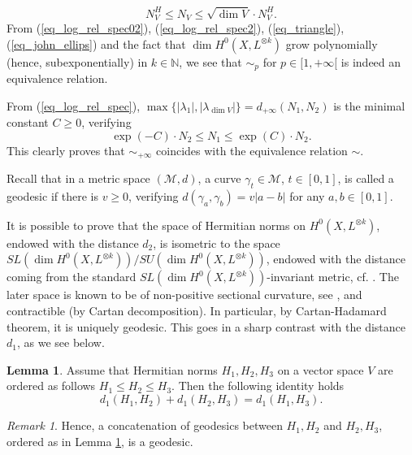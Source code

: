\documentclass[12pt]{article}
\numberwithin{equation}{section}
\theoremstyle{theorem}
\theoremstyle{definition}
\newtheorem{lem}[thm]{Lemma}
\theoremstyle{remark}
\newtheorem{rem}[thm]{Remark}
\newcommand{\nat}{\mathbb{N}}
\begin{document}
	\begin{equation}\label{eq_john_ellips}
		N_V^H \leq N_V \leq \sqrt{\dim V} \cdot N_V^H.
	\end{equation}
	From (\ref{eq_log_rel_spec02}), (\ref{eq_log_rel_spec2}), (\ref{eq_triangle}), (\ref{eq_john_ellips}) and the fact that $\dim H^0(X, L^{\otimes k})$ grow polynomially (hence, subexponentially) in $k \in \nat$, we see that $\sim_p$ for $p \in [1, +\infty[$ is indeed an equivalence relation.
	\par 
	From (\ref{eq_log_rel_spec}), $\max \{ |\lambda_1|, |\lambda_{\dim V}| \} = d_{+ \infty}(N_1, N_2)$ is the minimal constant $C \geq 0$, verifying
	\begin{equation}
		\exp(- C) \cdot N_2 \leq N_1 \leq \exp(C) \cdot N_2.
	\end{equation}
	This clearly proves that $\sim_{+ \infty}$ coincides with the equivalence relation $\sim$.
	\par 
	Recall that in a metric space $(\mathcal{M}, d)$, a curve $\gamma_t \in \mathcal{M}$, $t \in [0, 1]$, is called a geodesic if there is $v \geq 0$, verifying $d(\gamma_a, \gamma_b) = v |a - b|$ for any $a, b \in [0, 1]$.
	\par 
	It is possible to prove that the space of Hermitian norms on $H^0(X, L^{\otimes k})$, endowed with the distance $d_2$, is isometric to the space $SL(\dim H^0(X, L^{\otimes k})) / SU(\dim H^0(X, L^{\otimes k}))$, endowed with the distance coming from the standard $SL(\dim H^0(X, L^{\otimes k}))$-invariant metric, cf. \cite[Theorem 1.1]{DarvLuRub}.
	The later space is known to be of non-positive sectional curvature, see \cite[Theorem XI.8.6]{KobNom2}, and contractible (by Cartan decomposition).
	In particular, by Cartan-Hadamard theorem, it is uniquely geodesic.
	This goes in a sharp contrast with the distance $d_1$, as we see below.
	\par 
	\begin{lem}\label{lem_d_1_ident_metr}
		Assume that Hermitian norms $H_1, H_2, H_3$ on a vector space $V$ are ordered as follows $H_1 \leq H_2 \leq H_3$.
		Then the following identity holds
		\begin{equation}\label{eq_d_1_ident_metr}
			d_1(H_1, H_2) + d_1(H_2, H_3) = d_1(H_1, H_3).
		\end{equation}
	\end{lem}
	\begin{rem}
		Hence, a concatenation of geodesics between $H_1, H_2$ and $H_2, H_3$, ordered as in Lemma \ref{lem_d_1_ident_metr}, is a geodesic.
	\end{rem}
\end{document}
